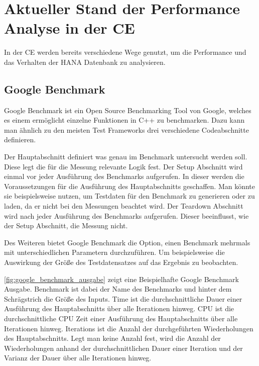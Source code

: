 \chapter{Aktueller Stand der Performance Analyse in der \acl{CE}}
In der \ac{CE} werden bereits verschiedene Wege genutzt, um die Performance und
das Verhalten der HANA Datenbank zu analysieren. 
\section{Google Benchmark}
\label{sec:google_benchmark}

Google Benchmark ist ein Open Source Benchmarking Tool von Google,
welches es einem ermöglicht einzelne Funktionen in C++ zu benchmarken. 
Dazu kann man ähnlich zu den meisten Test Frameworks drei verschiedene
Codeabschnitte definieren.

Der Hauptabschnitt definiert was genau im Benchmark untersucht werden
soll. Diese legt die für die Messung relevante Logik fest.
Der Setup Abschnitt wird einmal vor jeder Ausführung des Benchmarks
aufgerufen. In dieser werden die Voraussetzungen für die Ausführung des Hauptabschnitts
geschaffen. Man könnte sie beispielsweise nutzen, um Testdaten für den Benchmark
zu generieren oder zu laden, da er nicht bei den Messungen beachtet wird.
Der Teardown Abschnitt wird nach jeder Ausführung des Benchmarks aufgerufen.
Dieser beeinflusst, wie der Setup Abschnitt, die Messung nicht.

Des Weiteren bietet Google Benchmark die Option, einen Benchmark mehrmals mit
unterschiedlichen Parametern durchzuführen. Um beispielsweise die Auswirkung
der Größe des Testdatensatzes auf das Ergebnis zu beobachten.

\autoref{fig:google_benchmark_ausgabe} zeigt eine Beispielhafte Google
Benchmark Ausgabe. Benchmark ist dabei der Name des Benchmarks und hinter dem
Schrägstrich die Größe des Inputs. Time ist die durchschnittliche Dauer einer
Ausführung des Hauptabschnitts über alle Iterationen hinweg. CPU ist die
durchschnittliche CPU Zeit einer Ausführung des Hauptabschnitts über alle
Iterationen hinweg. Iterations ist die Anzahl der durchgeführten Wiederholungen
des Hauptabschnitts. Legt man keine Anzahl fest, wird die Anzahl der
Wiederholungen anhand der durchschnittlichen Dauer einer Iteration und der
Varianz der Dauer über alle Iterationen hinweg.
\autocite[Vgl.][]{GoogleBenchmark}

